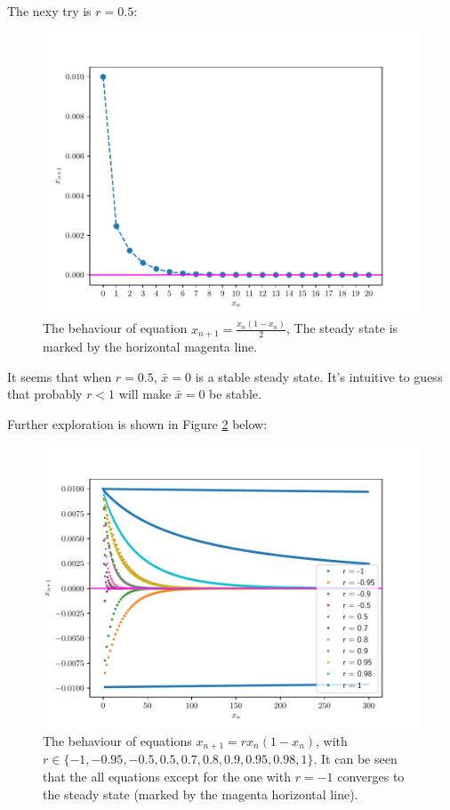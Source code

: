 \begin{homeworkProblem}[2]
\begin{enumerate}
The nexy try is $r=0.5$:
\begin{figure}
    \centering
    \caption[The behavior of equation $x_{n+1} = \frac{x_n(1-x_n)}{2}$]{
    The behaviour of equation $x_{n+1} = \frac{x_n(1-x_n)}{2}$,
    The steady state is marked by the horizontal magenta line.}
    \label{fig:fig2a2}
    \includegraphics[scale=0.6]{../fig/fig2(a)(2).pdf}
\end{figure}
It seems that when $r = 0.5$, $\bar x = 0$ is a stable steady state. It's
intuitive to guess that probably $r < 1$ will make $\bar x = 0$ be stable.

\pagebreak

Further exploration is shown in Figure \ref{fig:fig2a3} below:
\begin{figure}
    \centering
    \caption[The behavior of equations $x_{n+1} = rx_n(1-x_n)$]{
    The behaviour of equations $x_{n+1} = rx_n(1-x_n)$, with $r \in \{
        -1, -0.95, -0.5, 0.5, 0.7,0.8, 0.9, 0.95, 0.98, 1
    \}$. It can be seen that the all equations except for the one with $r = -1$
    converges to the steady state (marked by the magenta horizontal line).}
    \label{fig:fig2a3}
    \includegraphics[scale=0.6]{../fig/fig2(a)(3).pdf}
\end{figure}


\end{enumerate}
\end{homeworkProblem}
